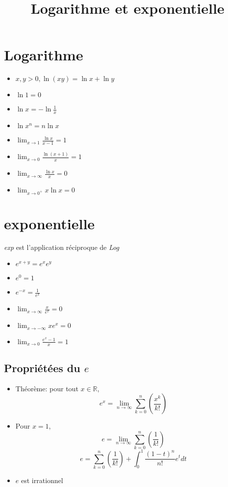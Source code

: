 \documentclass{article}
\title{Logarithme et exponentielle}
\date{}
\begin{document}
\maketitle

\section{Logarithme}
	\begin{itemize}
	\item $ x,y>0, \ln (xy) = \ln x + \ln y $
	\item $ \ln 1 = 0 $
	\item $ \ln x = -\ln \frac{1}{x} $
	\item $ \ln x^n = n\ln x $
	\newline

	\item $ \lim_{x\to 1} \frac{\ln x}{x-1} = 1 $
	\item $ \lim_{x\to 0} \frac{\ln (x+1)}{x} = 1 $
	\item $ \lim_{x\to\infty} \frac{\ln x}{x} = 0 $
	\item $ \lim_{x\to 0^+} x\ln x = 0 $
	\end{itemize}

\section{exponentielle}
\emph{exp} est l'application r\'{e}ciproque de \emph{Log}
	\begin{itemize}
	\item $ e^{x+y} = e^xe^y $
	\item $ e^0 = 1 $
	\item $ e^{-x} = \frac{1}{e^x} $
	\newline

	\item $ \lim_{x\to\infty} \frac{x}{e^x} = 0 $
	\item $ \lim_{x\to-\infty} xe^x = 0 $
	\item $ \lim_{x\to 0} \frac{e^x-1}{x} = 1 $
	\end{itemize}

\subsection{Propri\'{e}t\'{e}es du $e$}
\begin{itemize}
	\item Th\'{e}or\`{e}me: pour tout $x \in \mathbb{R}$,
	$$ e^x = \lim_{n\to\infty} \sum_{k=0}^{n} (\frac{x^k}{k!}) $$

	\item Pour $x = 1$,
	$$ e = \lim_{n\to\infty} \sum_{k=0}^{n} (\frac{1}{k!}) $$
	$$ e = \sum_{k=0}^{n} (\frac{1}{k!}) + \int_{0}^{1} \frac{(1-t)^n}{n!}e^tdt $$

	\item $e$ est irrationnel
\end{itemize}
\end{document}
